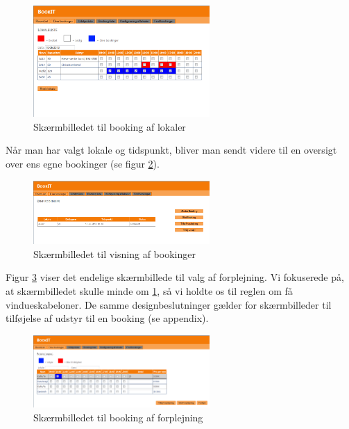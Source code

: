 \begin{figure}[h!]
  \centering
    \includegraphics[width=0.6\textwidth]{Appendix/GUI-Prototype/DigitalMockup/GridEksempel}
  \caption{Skærmbilledet til booking af lokaler}
\label{Design_G_Development_FinalGrid}
\end{figure}

Når man har valgt lokale og tidspunkt, bliver man sendt videre til en oversigt over ens egne bookinger (se figur \ref{Design_G_Development_YourBookings_Final}).

\begin{figure}[h!]
  \centering
    \includegraphics[width=0.6\textwidth]{Appendix/GUI-Prototype/DigitalMockup/DineBookinger}
  \caption{Skærmbilledet til visning af bookinger}
\label{Design_G_Development_YourBookings_Final}
\end{figure} 

Figur \ref{Design_G_Development_Forplejning_Final} viser det endelige skærmbillede til valg af forplejning. 
Vi fokuserede på, at skærmbilledet skulle minde om \ref{Design_G_Development_FinalGrid}, så vi holdte os til reglen om få vindueskabeloner. De samme designbeslutninger gælder for skærmbilleder til tilføjelse af udstyr til en booking (se appendix).

\begin{figure}[h!]
  \centering
    \includegraphics[width=0.6\textwidth]{Appendix/GUI-Prototype/DigitalMockup/Forplejning}
  \caption{Skærmbilledet til booking af forplejning}
\label{Design_G_Development_Forplejning_Final}
\end{figure} 

